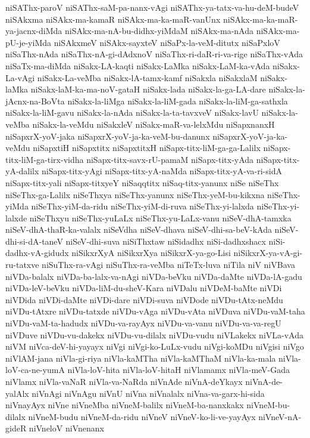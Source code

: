 {niSAThx-paroV
niSAThx-saM-pa-nanx-vAgi
niSAThx-ya-tatx-va-hu-deM-budeV
niSAkxma
niSAkx-ma-kamaR
niSAkx-ma-ka-maR-vanUnx
niSAkx-ma-ka-maR-ya-jacnx-diMda
niSAkx-ma-nA-bu-didhx-yiMdaM
niSAkx-ma-nAda
niSAkx-ma-pU-je-yiMda
niSAkxmeV
niSAkx-sayxteV
niSaPx-la-veM-ditutx
niSaPxloV
niSaThx-nAda
niSaThx-nA-gi-dAdxnoV
niSaThx-ri-daR-ri-va-rige
niSaThx-vAda
niSaTx-ma-diMda
niSakx-LA-kaqti
niSakx-LaMka
niSakx-LaM-ka-vAda
niSakx-La-vAgi
niSakx-La-veMba
niSakx-lA-tamx-kamf
niSakxla
niSakxlaM
niSakx-laMka
niSakx-laM-ka-ma-noV-gataH
niSakx-lada
niSakx-la-ga-LA-dare
niSakx-la-jAcnx-na-BoVta
niSakx-la-liMga
niSakx-la-liM-gada
niSakx-la-liM-ga-sathxla
niSakx-la-liM-gavu
niSakx-la-nAda
niSakx-la-ta-tavxveV
niSakx-lavU
niSakx-la-veMba
niSakx-la-veMdu
niSakxleV
niSakx-maR-va-lelxMdu
niSapxnanxH
niSapxrX-yoV-jaka
niSapxrX-yoV-ja-ka-veM-bu-danunx
niSapxrX-yoV-ja-ka-veMdu
niSapxtiH
niSapxtitx
niSapxtitxH
niSapx-titx-liM-ga-ga-Lalilx
niSapx-titx-liM-ga-tirx-vidha
niSapx-titx-savx-rU-pamaM
niSapx-titx-yAda
niSapx-titx-yA-dalilx
niSapx-titx-yAgi
niSapx-titx-yA-naMda
niSapx-titx-yA-va-ri-sidA
niSapx-titx-yali
niSapx-titxyeY
niSaqqtitx
niSaq-titx-yanunx
niSe
niSeThx
niSeThx-ga-Lalilx
niSeThxya
niSeThx-yanunx
niSeThx-yeM-bu-kikxna
niSeThx-yiMda
niSeThx-yiM-da-ridu
niSeThx-yiM-di-ruva
niSeThx-yi-lalxda
niSeThx-yi-lalxde
niSeThxyu
niSeThx-yuLaLx
niSeThx-yu-LaLx-vanu
niSeV-dhA-tamxka
niSeV-dhA-thaR-ka-valalx
niSeVdha
niSeV-dhava
niSeV-dhi-sa-beV-kAda
niSeV-dhi-si-dA-taneV
niSeV-dhi-suva
niSiThxtaw
niSidadhx
niSi-dadhxshacx
niSi-dadhx-vA-gidudx
niSikxrXyA
niSikxrXya
niSikxrX-ya-go-Lisi
niSikxrX-ya-vA-gi-ru-tatxve
niSuThx-ra-vAgi
niSuThx-ra-veMba
niTeTx-luva
niTila
niV
niVBava
niVDa-balalx
niVDa-ba-lalx-va-nAgi
niVDa-beVku
niVDa-daMte
niVDa-lA-gadu
niVDa-leV-beVku
niVDa-liM-du-sheV-Kara
niVDalu
niVDeM-baMte
niVDi
niVDida
niVDi-daMte
niVDi-dare
niVDi-suva
niVDode
niVDu-tAtx-neMdu
niVDu-tAtxre
niVDu-tatxde
niVDu-vAga
niVDu-vAta
niVDuva
niVDu-vaM-taha
niVDu-vaM-ta-hadudx
niVDu-va-rayAyx
niVDu-va-vanu
niVDu-va-va-regU
niVDuve
niVDu-vu-dakekx
niVDu-vu-dilalx
niVDu-vudu
niVLakekx
niVLa-vAda
niVM
niVca-deV-hi-yayayx
niVgi
niVgi-ko-LuLx-vudu
niVgi-koMDu
niVgisi
niVgo
niVlAM-jana
niVla-gi-riya
niVla-kaMTha
niVla-kaMThaM
niVla-ka-mala
niVla-loV-ca-ne-yumA
niVla-loV-hita
niVla-loV-hitaH
niVlamamx
niVla-meV-Gada
niVlamx
niVla-vaNaR
niVla-va-NaRda
niVnAde
niVnA-deYkayx
niVnA-de-yalAlx
niVnAgi
niVnAgu
niVnU
niVna
niVnalalx
niVna-va-garx-hi-sida
niVnayAyx
niVne
niVneMba
niVneM-balilx
niVneM-ba-nanxkakx
niVneM-bu-dilalx
niVneM-budu
niVneM-da-ridu
niVneV
niVneV-ko-li-ve-yayAyx
niVneV-nA-gideR
niVneloV
niVnenanx
}
